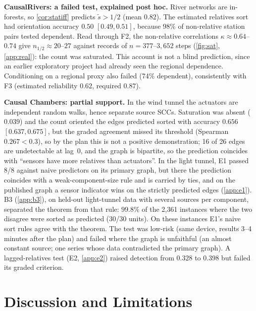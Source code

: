 \documentclass{article}
\theoremstyle{plain}
\theoremstyle{definition}
\theoremstyle{remark}
\newcommand{\nhalf}{n_{1/2}}
\begin{document}
\textbf{CausalRivers: a failed test, explained post hoc.} River networks are
in-forests, so \cref{cor:statiff} predicts $\tilde s>1/2$ (mean $0.82$). The
estimated relatives sort had orientation accuracy $0.50$ $[0.49,0.51]$, because
$98\%$ of non-relative station pairs tested dependent. Read through F2, the
non-relative correlations $\kappa\approx0.64$--$0.74$ give
$\nhalf\approx20$--$27$ against records of $n=377$--$3{,}652$ steps
(\cref{fig:sat}, \cref{app:real}): the count was saturated. This account is not
a blind prediction, since an earlier exploratory project had already seen the
regional dependence. Conditioning on a regional proxy also failed ($74\%$
dependent), consistently with F3 (estimated reliability $0.62$, required
$0.87$).

\textbf{Causal Chambers: partial support.} In the wind tunnel
\citep{gamella2025chambers} the actuators are independent random walks, hence
separate source SCCs. Saturation was absent ($0.039$) and the count oriented
the edges predicted sorted with accuracy $0.656$ $[0.637,0.675]$, but the graded
agreement missed its threshold (Spearman $0.267<0.3$), so by the plan this is
not a positive demonstration; 16 of 26 edges are undetectable at lag~0, and
the graph is bipartite, so the prediction coincides with ``sensors have more
relatives than actuators''. In the light tunnel, E1 passed 8/8 against naive
predictors on its primary graph, but there the prediction coincides with a
weak-component-size rule and is carried by ties, and on the published graph a
sensor indicator wins on the strictly predicted edges (\cref{app:e1}). B3
(\cref{app:b3}), on held-out light-tunnel data with several sources per
component, separated the theorem from that rule: $99.8\%$ of the 2{,}361
instances where the two disagree were sorted as predicted (30/30 units). On
these instances E1's naive sort rules agree with the theorem. The test was
low-risk (same device, results 3--4 minutes after the plan) and failed where
the graph is unfaithful (an almost constant source; one series whose data
contradicted the primary graph). A lagged-relatives test (E2, \cref{app:e2})
raised detection from $0.328$ to $0.398$ but failed its graded criterion.

\section{Discussion and Limitations}
\label{sec:disc}
\end{document}
